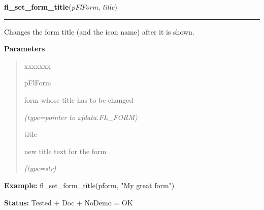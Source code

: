     \vspace{0.5ex}

\hspace{.8\funcindent}\begin{boxedminipage}{\funcwidth}

    \raggedright \textbf{fl\_set\_form\_title}(\textit{pFlForm}, \textit{title})

    \vspace{-1.5ex}

    \rule{\textwidth}{0.5\fboxrule}
\setlength{\parskip}{2ex}
    Changes the form title (and the icon name) after it is shown.

\setlength{\parskip}{1ex}
      \textbf{Parameters}
      \vspace{-1ex}

      \begin{quote}
        \begin{Ventry}{xxxxxxx}

          \item[pFlForm]

          form whose title has to be changed

            {\it (type=pointer to xfdata.FL\_FORM)}

          \item[title]

          new title text for the form

            {\it (type=str)}

        \end{Ventry}

      \end{quote}

\textbf{Example:} fl\_set\_form\_title(pform, "My great form")



\textbf{Status:} Tested + Doc + NoDemo = OK



    \end{boxedminipage}

    \label{xformslib:flbasic:fl_set_app_mainform}

    \vspace{0.5ex}

